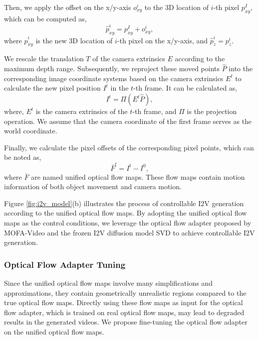 Then, we apply the offset on the x/y-axis $o^{i}_{xy}$ to the 3D location of $i$-th pixel $p^{I}_{xy}$, which can be computed as,
\begin{equation}
    \hat{p}^{i}_{xy} = p^{I}_{xy} + o^{i}_{xy},
\end{equation}
where $\hat{p}^{i}_{xy}$ is the new 3D location of $i$-th pixel on the x/y-axis, and $\hat{p}^{i}_{z} = p^{i}_{z}$.

We rescale the translation $T$ of the camera extrinsics $E$ according to the maximum depth range. Subsequently, we reproject these moved points $\hat{P}$ into the corresponding image coordinate systems based on the camera extrinsics $E^{t}$ to calculate the new pixel position $I^{t}$ in the $t$-th frame. It can be calculated as,
\begin{equation}
    I^{t} = \Pi(E^{t}\hat{P}),
\end{equation}
where, $E^{t}$ is the camera extrinsics of the $t$-th frame, and $\Pi$ is the projection operation. We assume that the camera coordinate of the first frame serves as the world coordinate.

Finally, we calculate the pixel offsets of the corresponding pixel points, which can be noted as,
\begin{equation}
    \bar{F}^{t} = I^{t} - I^{0},
\end{equation}
where $\bar{F}$ are named unified optical flow maps. These flow maps contain motion information of both object movement and camera motion.

Figure \ref{fig:i2v_model}(b) illustrates the process of controllable I2V generation according to the unified optical flow maps. By adopting the unified optical flow maps as the control conditions, we leverage the optical flow adapter proposed by MOFA-Video \cite{niu2024mofa} and the frozen I2V diffusion model SVD \cite{blattmann2023stable} to achieve controllable I2V generation.

\subsubsection{Optical Flow Adapter Tuning}
Since the unified optical flow maps involve many simplifications and approximations, they contain geometrically unrealistic regions compared to the true optical flow maps. Directly using these flow maps as input for the optical flow adapter, which is trained on real optical flow maps, may lead to degraded results in the generated videos. We propose fine-tuning the optical flow adapter on the unified optical flow maps.


